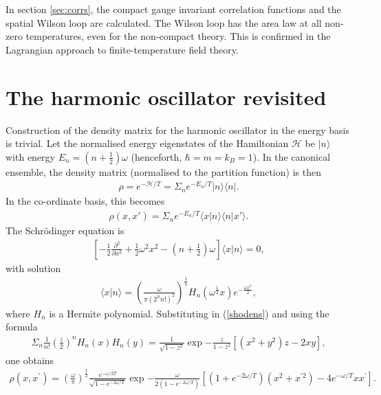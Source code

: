 \documentclass[a4paper,a4paper]{article}
\begin{document}
In section \ref{sec:corrs}, the compact gauge invariant correlation functions and the spatial Wilson loop are calculated.
The Wilson loop has the area law at all non-zero temperatures, even for the non-compact theory.
This is confirmed in the Lagrangian approach to finite-temperature field theory.
%
%
%
%
%
%
\section{The harmonic oscillator revisited} \label{sec:sho}
Construction of the density matrix for the harmonic oscillator in the energy basis is trivial. 
Let the normalised energy eigenstates 
of the Hamiltonian $\mathcal{H}$
be $| n \rangle$ with energy $E_n = (n + \frac{1}{2}) \omega$ (henceforth, $\hbar = m = k_B = 1$). 
In the canonical ensemble, the density matrix (normalised to the partition function) is then
\begin{gather}
\rho = e^{-\mathcal{H}/T} = \Sigma_n e^{- E_n/T} |n \rangle \langle n |.
\end{gather}
In the co-ordinate basis, this becomes
\begin{gather} \label{shodens}
\rho (x,x') = \Sigma_n e^{-E_n/T} \langle x |n\rangle \langle n | x' \rangle.
\end{gather}
The Schr\"{o}dinger equation is
\begin{gather}
\left[-\frac{1}{2}  \frac{\partial^2}{\partial x^2}  + \frac{1}{2} \omega^2 x^2 - \left( n + \frac{1}{2} \right) \omega \right]
\langle x | n\rangle = 0,
\end{gather}
with solution
\begin{gather}
\langle x | n\rangle = \left( \frac{\omega}{\pi (2^n n!)^2} \right)^{\frac{1}{4}} 
H_n (\omega^{\frac{1}{2}} x ) e^{-\frac{\omega x^2}{2}},
\end{gather}
where $H_n$ is a Hermite polynomial.
Substituting in (\ref{shodens}) and using the formula \cite{Eboli:1988fm}
\begin{gather}
\Sigma_n \frac{1}{n!}
\left( \frac{z}{2} \right)^n H_n (x) H_n (y) = \frac{1}{\sqrt{1-z^2}} \exp{-\frac{z}{1-z^2} \left[(x^2 +y^2)z -2xy \right] },
\end{gather}
one obtains
\begin{gather} \label{shodens2}
\rho (x,x^{'}) = \left( \frac{\omega}{\pi} \right)^{\frac{1}{2}} \frac{e^{ -\omega / 2 T}}{\sqrt{1-e^{-2\omega / T}}}
\exp{-\frac{\omega}{2(1-e^{-2\omega / T})} \left[ (1+e^{-2\omega / T})(x^2 +x^{'2})  - 4 e^{-\omega / T} x x^{'} \right] }.
\end{gather}
\end{document}
